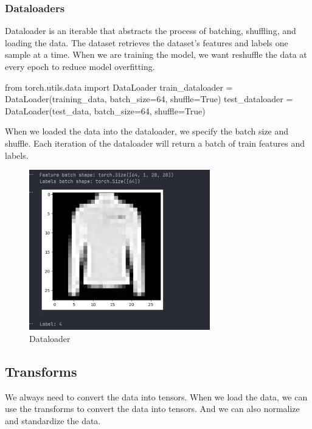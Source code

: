 \documentclass[12pt,hyperref,a4paper,UTF8]{article}
\begin{document}
\subsubsection{Dataloaders}
\textbf{} Dataloader is an iterable that abstracts the process of batching, shuffling, and loading the data. The dataset retrieves the dataset's features and labels one sample at a time. When we are training the model, we want reshuffle the data at every epoch to reduce model overfitting.

\begin{python}
    from torch.utils.data import DataLoader
    train_dataloader = DataLoader(training_data, batch_size=64, shuffle=True)
    test_dataloader = DataLoader(test_data, batch_size=64, shuffle=True)
\end{python}

\textbf{} When we loaded the data into the dataloader, we specify the batch size and shuffle. Each iteration of the dataloader will return a batch of train features and labels.

\begin{figure}[h]
    \centering
    \includegraphics[width=0.7\textwidth]{figures/sample.png}
    \caption{Dataloader}
\end{figure}

\subsection{Transforms}
\textbf{} We always need to convert the data into tensors. When we load the data, we can use the transforms to convert the data into tensors. And we can also normalize and standardize the data.
\end{document}
